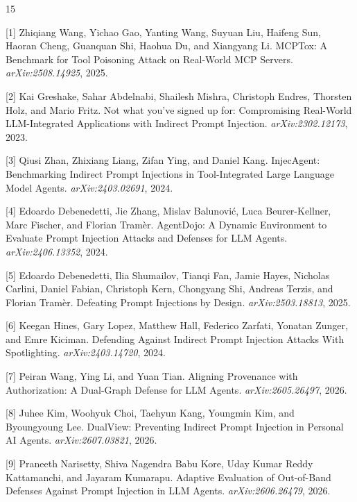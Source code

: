 \documentclass[11pt,letterpaper]{article}
\begin{document}
\makeatletter
\def\@biblabel#1{}
\makeatother
\begin{thebibliography}{15}
\setlength{\itemindent}{-\leftmargin}

[1] Zhiqiang Wang, Yichao Gao, Yanting Wang, Suyuan Liu, Haifeng Sun, Haoran Cheng, Guanquan Shi, Haohua Du, and Xiangyang Li.
\newblock MCPTox: A Benchmark for Tool Poisoning Attack on Real-World MCP Servers.
\newblock \emph{arXiv:2508.14925}, 2025.

[2] Kai Greshake, Sahar Abdelnabi, Shailesh Mishra, Christoph Endres, Thorsten Holz, and Mario Fritz.
\newblock Not what you've signed up for: Compromising Real-World LLM-Integrated Applications with Indirect Prompt Injection.
\newblock \emph{arXiv:2302.12173}, 2023.

[3] Qiusi Zhan, Zhixiang Liang, Zifan Ying, and Daniel Kang.
\newblock InjecAgent: Benchmarking Indirect Prompt Injections in Tool-Integrated Large Language Model Agents.
\newblock \emph{arXiv:2403.02691}, 2024.

[4] Edoardo Debenedetti, Jie Zhang, Mislav Balunovi\'{c}, Luca Beurer-Kellner, Marc Fischer, and Florian Tram\`{e}r.
\newblock AgentDojo: A Dynamic Environment to Evaluate Prompt Injection Attacks and Defenses for LLM Agents.
\newblock \emph{arXiv:2406.13352}, 2024.

[5] Edoardo Debenedetti, Ilia Shumailov, Tianqi Fan, Jamie Hayes, Nicholas Carlini, Daniel Fabian, Christoph Kern, Chongyang Shi, Andreas Terzis, and Florian Tram\`{e}r.
\newblock Defeating Prompt Injections by Design.
\newblock \emph{arXiv:2503.18813}, 2025.

[6] Keegan Hines, Gary Lopez, Matthew Hall, Federico Zarfati, Yonatan Zunger, and Emre Kiciman.
\newblock Defending Against Indirect Prompt Injection Attacks With Spotlighting.
\newblock \emph{arXiv:2403.14720}, 2024.

[7] Peiran Wang, Ying Li, and Yuan Tian.
\newblock Aligning Provenance with Authorization: A Dual-Graph Defense for LLM Agents.
\newblock \emph{arXiv:2605.26497}, 2026.

[8] Juhee Kim, Woohyuk Choi, Taehyun Kang, Youngmin Kim, and Byoungyoung Lee.
\newblock DualView: Preventing Indirect Prompt Injection in Personal AI Agents.
\newblock \emph{arXiv:2607.03821}, 2026.

[9] Praneeth Narisetty, Shiva Nagendra Babu Kore, Uday Kumar Reddy Kattamanchi, and Jayaram Kumarapu.
\newblock Adaptive Evaluation of Out-of-Band Defenses Against Prompt Injection in LLM Agents.
\newblock \emph{arXiv:2606.26479}, 2026.


\end{thebibliography}
\end{document}
